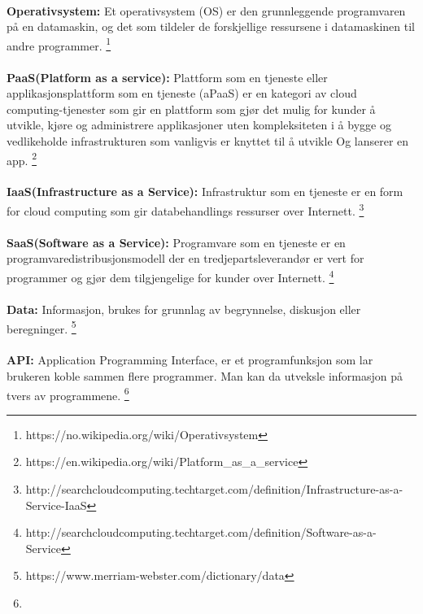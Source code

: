 \paragraph{} {\bfseries Operativsystem:} Et operativsystem (OS) er den grunnleggende programvaren på en datamaskin, og det som tildeler de forskjellige ressursene i datamaskinen til andre programmer.
\footnote{https://no.wikipedia.org/wiki/Operativsystem}

\paragraph{} {\bfseries PaaS(Platform as a service):}  Plattform som en tjeneste eller applikasjonsplattform som en tjeneste (aPaaS) er en kategori av cloud 
computing-tjenester som gir en plattform som gjør det mulig for kunder å utvikle, kjøre og administrere applikasjoner 
uten kompleksiteten i å bygge og vedlikeholde infrastrukturen som vanligvis er knyttet til å utvikle Og lanserer en app.
\footnote{https://en.wikipedia.org/wiki/Platform\_as\_a\_service}

\paragraph{} {\bfseries IaaS(Infrastructure as a Service):} Infrastruktur som en tjeneste er en form for cloud computing som gir databehandlings ressurser over Internett.
\footnote{http://searchcloudcomputing.techtarget.com/definition/Infrastructure-as-a-Service-IaaS}

\paragraph{} {\bfseries SaaS(Software as a Service):} Programvare som en tjeneste er en programvaredistribusjonsmodell 
der en tredjepartsleverandør er vert for programmer og gjør dem tilgjengelige for kunder over Internett.
\footnote{http://searchcloudcomputing.techtarget.com/definition/Software-as-a-Service}

\paragraph{} {\bfseries Data:} Informasjon, brukes for grunnlag av begrynnelse, diskusjon eller beregninger. 
\footnote{https://www.merriam-webster.com/dictionary/data}

\paragraph{} {\bfseries API:} Application Programming Interface, er et programfunksjon som lar brukeren koble sammen flere programmer.  Man kan da utveksle informasjon på tvers av programmene. 
\footnote{}
